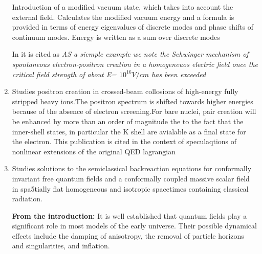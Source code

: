 \begin{enumerate}
Introduction of a modified vacuum state, which takes into account the external field. Calculates the modified vacuum energy and a formula is provided in terms of energy eigenvalues of discrete modes and phase shifts of continuum modes. Energy is written as a sum over discrete modes 

In \cite{Mohr1998} it is cited as \textit{AS a siemple example we note the Schwinger mechanism of spontaneous electron-positron creation in a homogeneuos electric field once the critical field strength of about E= $10^{16}V/cm$ has been exceeded}

\item \cite{Mueller1988} Studies positron creation in crossed-beam collosions of high-energy fully stripped heavy ions.The positron spectrum is shifted towards higher energies because of the absence of electron screening.For bare nuclei, pair creation will be enhanced by more than an order of magnitude the to the fact that the inner-shell states, in particular the K shell are avialable as a final state for the electron. This publication is cited \cite{Mohr1998} in the context of speculaqtions of nonlinear extensions of the original QED lagrangian

\item \cite{PhysRevD.32.1302} Studies solutions to the semiclassical backreaction equations for conformally invariant free quantum fields and a conformally coupled massive scalar field in spa5tially flat homogeneous and isotropic spacetimes containing classical radiation.

\textbf{From the introduction:} It is well established that quantum fields play a significant role in most models of the early universe. Their possible dynamical effects include the damping of anisotropy, the removal of particle horizons and singularities, and inflation. 


\end{enumerate}
